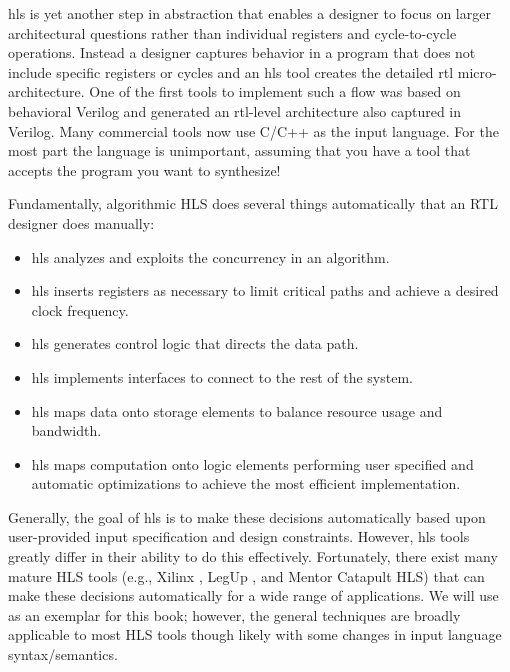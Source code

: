  \gls{hls} is yet another step in abstraction that enables a designer to focus on larger architectural questions rather than individual registers and cycle-to-cycle operations.  Instead a designer captures behavior in a program that does not include specific registers or cycles and an \gls{hls} tool creates the detailed \gls{rtl} micro-architecture.  One of the first tools to implement such a flow was based on behavioral Verilog and generated an \gls{rtl}-level architecture also captured in Verilog\cite{knapp96bc}.  Many commercial tools now use C/C++ as the input language.  For the most part the language is unimportant, assuming that you have a tool that accepts the program you want to synthesize!

Fundamentally, algorithmic HLS does several things automatically that an RTL designer does manually:
\begin{itemize}
\item \gls{hls} analyzes and exploits the concurrency in an algorithm.
\item \gls{hls} inserts registers as necessary to limit critical paths and achieve a desired clock frequency.
\item \gls{hls} generates control logic that directs the data path.
\item \gls{hls} implements interfaces to connect to the rest of the system.
\item \gls{hls} maps data onto storage elements to balance resource usage and bandwidth.
\item \gls{hls} maps computation onto logic elements performing user specified and automatic optimizations to achieve the most efficient implementation.
\end{itemize}

Generally, the goal of \gls{hls} is to make these decisions automatically based upon user-provided input specification and design constraints.  However, \gls{hls} tools greatly differ in their ability to do this effectively.  Fortunately, there exist many mature HLS tools (e.g., Xilinx \VHLS, LegUp \cite{canis2011legup}, and Mentor Catapult HLS) that can make these decisions automatically for a wide range of applications. We will use \VHLS as an exemplar for this book; however, the general techniques are broadly applicable to most HLS tools though likely with some changes in input language syntax/semantics. %

